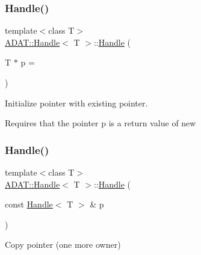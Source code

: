\mbox{\label{classADAT_1_1Handle_a510e41b73c3f685f4eb78a91020782c0}} 
\subsubsection{\texorpdfstring{Handle()}{Handle()}\hspace{0.1cm}{\footnotesize\ttfamily [5/6]}}
{\footnotesize\ttfamily template$<$class T$>$ \\
\mbox{\hyperlink{classADAT_1_1Handle}{A\+D\+A\+T\+::\+Handle}}$<$ T $>$\+::\mbox{\hyperlink{classADAT_1_1Handle}{Handle}} (\begin{DoxyParamCaption}\item[{T $\ast$}]{p = {} }\end{DoxyParamCaption})\hspace{0.3cm}{\ttfamily [inline]}}



Initialize pointer with existing pointer. 

Requires that the pointer p is a return value of new \mbox{\label{classADAT_1_1Handle_af9529874ca6ca9db10dbbeeb0a776d84}} 
\subsubsection{\texorpdfstring{Handle()}{Handle()}\hspace{0.1cm}{\footnotesize\ttfamily [6/6]}}
{\footnotesize\ttfamily template$<$class T$>$ \\
\mbox{\hyperlink{classADAT_1_1Handle}{A\+D\+A\+T\+::\+Handle}}$<$ T $>$\+::\mbox{\hyperlink{classADAT_1_1Handle}{Handle}} (\begin{DoxyParamCaption}\item[{const \mbox{\hyperlink{classADAT_1_1Handle}{Handle}}$<$ T $>$ \&}]{p }\end{DoxyParamCaption})\hspace{0.3cm}{\ttfamily [inline]}}



Copy pointer (one more owner) 

\mbox{\label{classADAT_1_1Handle_a358ca2d3df9674e7ccb416574df96ce5}} 
